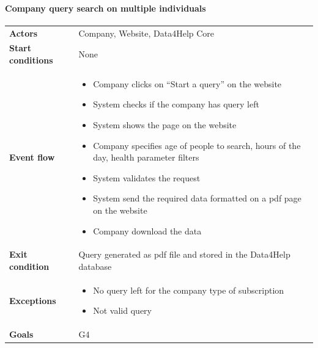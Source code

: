 \paragraph{Company query search on multiple individuals}
\begin{center}
\begin{table}[H]
\centering
\begin{tabular}{l|p{}}
\textbf{Actors} &
Company, Website, Data4Help Core
 \\
\textbf{Start conditions} & None \\
\textbf{Event flow}  &  \begin{minipage}[t]{0.7\textwidth}
    \begin{itemize}
        \item Company clicks on “Start a query” on the website


        \item System checks if the company has query left

        \item System shows the page on the website
        \item Company specifies age of people to search, hours of the day, health parameter filters
 
        \item System validates the request
        \item System send the required data formatted on a pdf page on the website
        \item Company download the data

    \end{itemize}
    
\end{minipage} \\
\textbf{Exit condition} & Query generated as pdf file and stored in the Data4Help database \\
\textbf{Exceptions} & \begin{minipage}[t]{0.7\textwidth}
    \begin{itemize}
        \item No query left for the company type of subscription
        \item Not valid query
    \end{itemize}
    
\end{minipage} \\
\textbf{Goals} & G4
\end{tabular}

\end{table}
\end{center}

